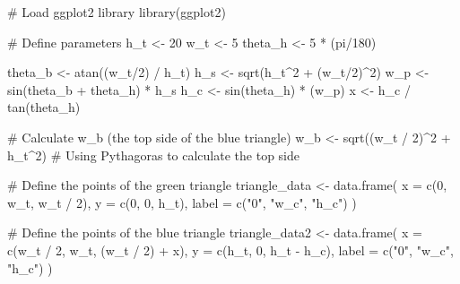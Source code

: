 \documentclass[
  letterpaper,
  DIV=11,
  numbers=noendperiod]{scrartcl}
\newenvironment{Shaded}{\begin{snugshade}}{\end{snugshade}}
\newcommand{\AttributeTok}[1]{\textcolor[rgb]{0.40,0.45,0.13}{#1}}
\newcommand{\CommentTok}[1]{\textcolor[rgb]{0.37,0.37,0.37}{#1}}
\newcommand{\DecValTok}[1]{\textcolor[rgb]{0.68,0.00,0.00}{#1}}
\newcommand{\FunctionTok}[1]{\textcolor[rgb]{0.28,0.35,0.67}{#1}}
\newcommand{\NormalTok}[1]{\textcolor[rgb]{0.00,0.23,0.31}{#1}}
\newcommand{\OtherTok}[1]{\textcolor[rgb]{0.00,0.23,0.31}{#1}}
\newcommand{\SpecialCharTok}[1]{\textcolor[rgb]{0.37,0.37,0.37}{#1}}
\newcommand{\StringTok}[1]{\textcolor[rgb]{0.13,0.47,0.30}{#1}}
\begin{document}
\begin{Shaded}
\begin{Highlighting}[]
\CommentTok{\# Load ggplot2 library}
\FunctionTok{library}\NormalTok{(ggplot2)}

\CommentTok{\# Define parameters}
\NormalTok{h\_t }\OtherTok{\textless{}{-}} \DecValTok{20}
\NormalTok{w\_t }\OtherTok{\textless{}{-}} \DecValTok{5}
\NormalTok{theta\_h }\OtherTok{\textless{}{-}} \DecValTok{5} \SpecialCharTok{*}\NormalTok{ (pi}\SpecialCharTok{/}\DecValTok{180}\NormalTok{)}

\NormalTok{theta\_b }\OtherTok{\textless{}{-}} \FunctionTok{atan}\NormalTok{((w\_t}\SpecialCharTok{/}\DecValTok{2}\NormalTok{) }\SpecialCharTok{/}\NormalTok{ h\_t)}
\NormalTok{h\_s }\OtherTok{\textless{}{-}} \FunctionTok{sqrt}\NormalTok{(h\_t}\SpecialCharTok{\^{}}\DecValTok{2} \SpecialCharTok{+}\NormalTok{ (w\_t}\SpecialCharTok{/}\DecValTok{2}\NormalTok{)}\SpecialCharTok{\^{}}\DecValTok{2}\NormalTok{)}
\NormalTok{w\_p }\OtherTok{\textless{}{-}} \FunctionTok{sin}\NormalTok{(theta\_b }\SpecialCharTok{+}\NormalTok{ theta\_h) }\SpecialCharTok{*}\NormalTok{ h\_s}
\NormalTok{h\_c }\OtherTok{\textless{}{-}} \FunctionTok{sin}\NormalTok{(theta\_h) }\SpecialCharTok{*}\NormalTok{ (w\_p)}
\NormalTok{x }\OtherTok{\textless{}{-}}\NormalTok{ h\_c }\SpecialCharTok{/} \FunctionTok{tan}\NormalTok{(theta\_h)}

\CommentTok{\# Calculate w\_b (the top side of the blue triangle)}
\NormalTok{w\_b }\OtherTok{\textless{}{-}} \FunctionTok{sqrt}\NormalTok{((w\_t }\SpecialCharTok{/} \DecValTok{2}\NormalTok{)}\SpecialCharTok{\^{}}\DecValTok{2} \SpecialCharTok{+}\NormalTok{ h\_t}\SpecialCharTok{\^{}}\DecValTok{2}\NormalTok{)  }\CommentTok{\# Using Pythagoras to calculate the top side}

\CommentTok{\# Define the points of the green triangle}
\NormalTok{triangle\_data }\OtherTok{\textless{}{-}} \FunctionTok{data.frame}\NormalTok{(}
  \AttributeTok{x =} \FunctionTok{c}\NormalTok{(}\DecValTok{0}\NormalTok{, w\_t, w\_t }\SpecialCharTok{/} \DecValTok{2}\NormalTok{),}
  \AttributeTok{y =} \FunctionTok{c}\NormalTok{(}\DecValTok{0}\NormalTok{, }\DecValTok{0}\NormalTok{, h\_t),}
  \AttributeTok{label =} \FunctionTok{c}\NormalTok{(}\StringTok{"0"}\NormalTok{, }\StringTok{"w\_c"}\NormalTok{, }\StringTok{"h\_c"}\NormalTok{)}
\NormalTok{)}

\CommentTok{\# Define the points of the blue triangle}
\NormalTok{triangle\_data2 }\OtherTok{\textless{}{-}} \FunctionTok{data.frame}\NormalTok{(}
  \AttributeTok{x =} \FunctionTok{c}\NormalTok{(w\_t }\SpecialCharTok{/} \DecValTok{2}\NormalTok{, w\_t, (w\_t }\SpecialCharTok{/} \DecValTok{2}\NormalTok{) }\SpecialCharTok{+}\NormalTok{ x),}
  \AttributeTok{y =} \FunctionTok{c}\NormalTok{(h\_t, }\DecValTok{0}\NormalTok{, h\_t }\SpecialCharTok{{-}}\NormalTok{ h\_c),}
  \AttributeTok{label =} \FunctionTok{c}\NormalTok{(}\StringTok{"0"}\NormalTok{, }\StringTok{"w\_c"}\NormalTok{, }\StringTok{"h\_c"}\NormalTok{)}
\NormalTok{)}


\end{Highlighting}
\end{Shaded}
\end{document}
